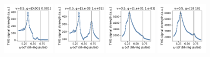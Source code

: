 \documentclass[a4paper]{article}
\begin{document}
\begin{figure}[H]
  \centering
  \includegraphics[width=0.23\textwidth]{driving-v3-case0.pdf}
  \includegraphics[width=0.23\textwidth]{driving-v3-case1.pdf}
  \includegraphics[width=0.23\textwidth]{driving-v3-case2.pdf}
  \includegraphics[width=0.23\textwidth]{driving-v3-case3.pdf}
\end{figure}
\end{document}
